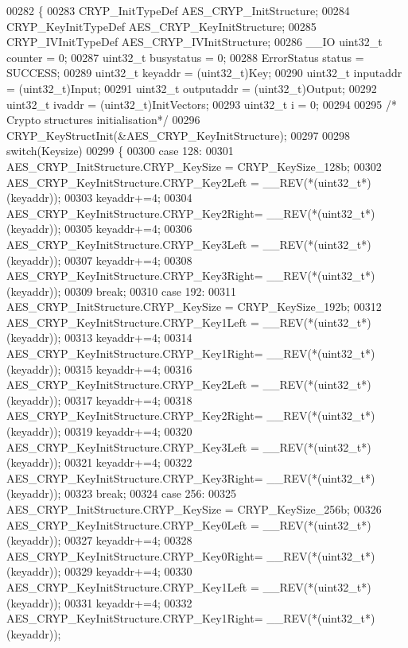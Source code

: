 \begin{DoxyCode}
00282 \{
00283   CRYP\_InitTypeDef AES\_CRYP\_InitStructure;
00284   CRYP\_KeyInitTypeDef AES\_CRYP\_KeyInitStructure;
00285   CRYP\_IVInitTypeDef AES\_CRYP\_IVInitStructure;
00286   \_\_IO uint32\_t counter = 0;
00287   uint32\_t busystatus = 0;
00288   ErrorStatus status = SUCCESS;
00289   uint32\_t keyaddr    = (uint32\_t)Key;
00290   uint32\_t inputaddr  = (uint32\_t)Input;
00291   uint32\_t outputaddr = (uint32\_t)Output;
00292   uint32\_t ivaddr     = (uint32\_t)InitVectors;
00293   uint32\_t i = 0;
00294 
00295   \textcolor{comment}{/* Crypto structures initialisation*/}
00296   CRYP_KeyStructInit(&AES\_CRYP\_KeyInitStructure);
00297 
00298   \textcolor{keywordflow}{switch}(Keysize)
00299   \{
00300     \textcolor{keywordflow}{case} 128:
00301     AES\_CRYP\_InitStructure.CRYP_KeySize = CRYP_KeySize_128b;
00302     AES\_CRYP\_KeyInitStructure.CRYP\_Key2Left = \_\_REV(*(uint32\_t*)(keyaddr));
00303     keyaddr+=4;
00304     AES\_CRYP\_KeyInitStructure.CRYP\_Key2Right= \_\_REV(*(uint32\_t*)(keyaddr));
00305     keyaddr+=4;
00306     AES\_CRYP\_KeyInitStructure.CRYP\_Key3Left = \_\_REV(*(uint32\_t*)(keyaddr));
00307     keyaddr+=4;
00308     AES\_CRYP\_KeyInitStructure.CRYP\_Key3Right= \_\_REV(*(uint32\_t*)(keyaddr));
00309     \textcolor{keywordflow}{break};
00310     \textcolor{keywordflow}{case} 192:
00311     AES\_CRYP\_InitStructure.CRYP_KeySize  = CRYP_KeySize_192b;
00312     AES\_CRYP\_KeyInitStructure.CRYP\_Key1Left = \_\_REV(*(uint32\_t*)(keyaddr));
00313     keyaddr+=4;
00314     AES\_CRYP\_KeyInitStructure.CRYP\_Key1Right= \_\_REV(*(uint32\_t*)(keyaddr));
00315     keyaddr+=4;
00316     AES\_CRYP\_KeyInitStructure.CRYP\_Key2Left = \_\_REV(*(uint32\_t*)(keyaddr));
00317     keyaddr+=4;
00318     AES\_CRYP\_KeyInitStructure.CRYP\_Key2Right= \_\_REV(*(uint32\_t*)(keyaddr));
00319     keyaddr+=4;
00320     AES\_CRYP\_KeyInitStructure.CRYP\_Key3Left = \_\_REV(*(uint32\_t*)(keyaddr));
00321     keyaddr+=4;
00322     AES\_CRYP\_KeyInitStructure.CRYP\_Key3Right= \_\_REV(*(uint32\_t*)(keyaddr));
00323     \textcolor{keywordflow}{break};
00324     \textcolor{keywordflow}{case} 256:
00325     AES\_CRYP\_InitStructure.CRYP_KeySize  = CRYP_KeySize_256b;
00326     AES\_CRYP\_KeyInitStructure.CRYP\_Key0Left = \_\_REV(*(uint32\_t*)(keyaddr));
00327     keyaddr+=4;
00328     AES\_CRYP\_KeyInitStructure.CRYP\_Key0Right= \_\_REV(*(uint32\_t*)(keyaddr));
00329     keyaddr+=4;
00330     AES\_CRYP\_KeyInitStructure.CRYP\_Key1Left = \_\_REV(*(uint32\_t*)(keyaddr));
00331     keyaddr+=4;
00332     AES\_CRYP\_KeyInitStructure.CRYP\_Key1Right= \_\_REV(*(uint32\_t*)(keyaddr));

\end{DoxyCode}
